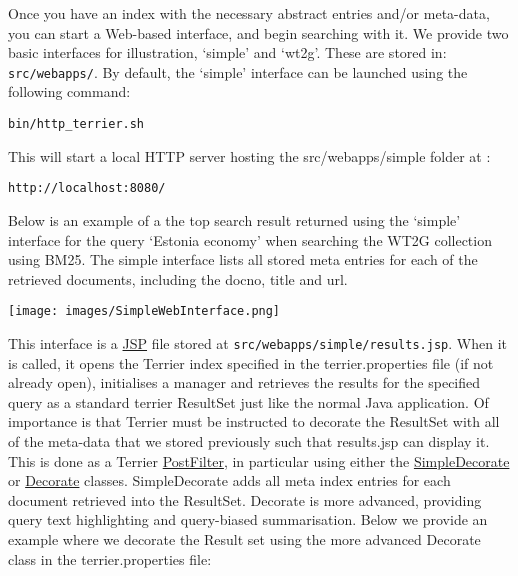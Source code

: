 Once you have an index with the necessary abstract entries and/or
meta-data, you can start a Web-based interface, and begin searching with
it. We provide two basic interfaces for illustration, `simple' and
`wt2g'. These are stored in: \texttt{src/webapps/}. By default, the
`simple' interface can be launched using the following command:

\begin{verbatim}
bin/http_terrier.sh
\end{verbatim}

This will start a local HTTP server hosting the src/webapps/simple
folder at :

\begin{verbatim}
http://localhost:8080/
\end{verbatim}

Below is an example of a the top search result returned using the
`simple' interface for the query `Estonia economy' when searching the
WT2G collection using BM25. The simple interface lists all stored meta
entries for each of the retrieved documents, including the docno, title
and url.

\texttt{[image: images/SimpleWebInterface.png]}

This interface is a
\href{http://en.wikipedia.org/wiki/JavaServer_Pages}{JSP} file stored at
\texttt{src/webapps/simple/results.jsp}. When it is called, it opens the
Terrier index specified in the terrier.properties file (if not already
open), initialises a manager and retrieves the results for the specified
query as a standard terrier ResultSet just like the normal Java
application. Of importance is that Terrier must be instructed to
decorate the ResultSet with all of the meta-data that we stored
previously such that results.jsp can display it. This is done as a
Terrier \href{javadoc/org/terrier/querying/PostFilter.html}{PostFilter},
in particular using either the
\href{javadoc/org/terrier/querying/SimpleDecorate.html}{SimpleDecorate}
or \href{javadoc/org/terrier/querying/Decorate.html}{Decorate} classes.
SimpleDecorate adds all meta index entries for each document retrieved
into the ResultSet. Decorate is more advanced, providing query text
highlighting and query-biased summarisation. Below we provide an example
where we decorate the Result set using the more advanced Decorate class
in the terrier.properties file:

